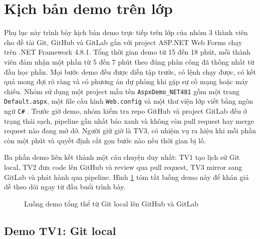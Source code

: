 \section{Kịch bản demo trên lớp}
\label{sec:phulucD-kichban}

Phụ lục này trình bày kịch bản demo trực tiếp trên lớp của nhóm 3 thành viên cho đề tài Git, GitHub và GitLab gắn với project ASP.NET Web Forms chạy trên .NET Framework 4.8.1.
Tổng thời gian demo từ 15 đến 18 phút, mỗi thành viên đảm nhận một phần từ 5 đến 7 phút theo đúng phân công đã thống nhất từ đầu học phần.
Mọi bước demo đều được diễn tập trước, có lệnh chạy được, có kết quả mong đợi rõ ràng và có phương án dự phòng khi gặp sự cố mạng hoặc máy chiếu.
Nhóm sử dụng một project mẫu tên \verb|AspxDemo_NET481| gồm một trang \verb|Default.aspx|, một file cấu hình \verb|Web.config| và một thư viện lớp viết bằng ngôn ngữ \verb|C#| \cite{progit,msnetfx}.
Trước giờ demo, nhóm kiểm tra repo GitHub và project GitLab đều ở trạng thái sạch, pipeline gần nhất báo xanh và không còn pull request hay merge request nào đang mở dở.
Người giữ giờ là TV3, có nhiệm vụ ra hiệu khi mỗi phần còn một phút và quyết định cắt gọn bước nào nếu thời gian bị lố.

Ba phần demo liên kết thành một câu chuyện duy nhất: TV1 tạo lịch sử Git local, TV2 đưa code lên GitHub và review qua pull request, TV3 mirror sang GitLab và phát hành qua pipeline.
Hình \ref{fig:phulucD-luongdemo} tóm tắt luồng demo này để khán giả dễ theo dõi ngay từ đầu buổi trình bày.

\begin{figure}[H]
\centering
{}
\caption{Luồng demo tổng thể từ Git local lên GitHub và GitLab}
\label{fig:phulucD-luongdemo}
\end{figure}

\subsection{Demo TV1: Git local}
\label{subsec:phulucD-tv1}

